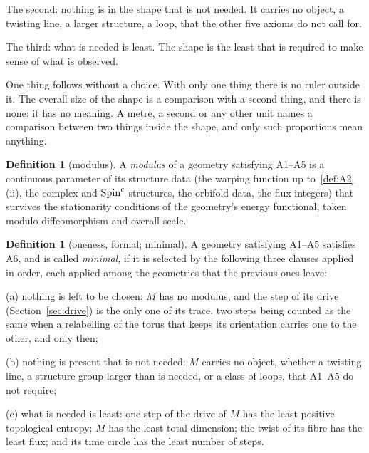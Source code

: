\documentclass[11pt,a4paper]{article}
\theoremstyle{plain}
\theoremstyle{definition}
\newtheorem{definition}[theorem]{Definition}
\theoremstyle{remark}
\begin{document}
The second: nothing is in the shape that is not needed. It carries no object, a twisting line, a larger structure, a loop, that the other five axioms do not call for.

The third: what is needed is least. The shape is the least that is required to make sense of what is observed.

One thing follows without a choice. With only one thing there is no ruler outside it. The overall size of the shape is a comparison with a second thing, and there is none: it has no meaning. A metre, a second or any other unit names a comparison between two things inside the shape, and only such proportions mean anything.

\begin{definition}[modulus]\label{def:modulus}
A \emph{modulus} of a geometry satisfying A1--A5 is a continuous parameter of its structure data (the warping function up to~\eqref{def:A2}(ii), the complex and $\text{Spin}^c$ structures, the orbifold data, the flux integers) that survives the stationarity conditions of the geometry's energy functional, taken modulo diffeomorphism and overall scale.
\end{definition}

\begin{definition}[oneness, formal; minimal]\label{def:minimal}
A geometry satisfying A1--A5 satisfies A6, and is called \emph{minimal}, if it is selected by the following three clauses applied in order, each applied among the geometries that the previous ones leave:

(a) nothing is left to be chosen: $M$ has no modulus, and the step of its drive (Section~\ref{sec:drive}) is the only one of its trace, two steps being counted as the same when a relabelling of the torus that keeps its orientation carries one to the other, and only then;

(b) nothing is present that is not needed: $M$ carries no object, whether a twisting line, a structure group larger than is needed, or a class of loops, that A1--A5 do not require;

(c) what is needed is least: one step of the drive of $M$ has the least positive topological entropy; $M$ has the least total dimension; the twist of its fibre has the least flux; and its time circle has the least number of steps.
\end{definition}
\end{document}
